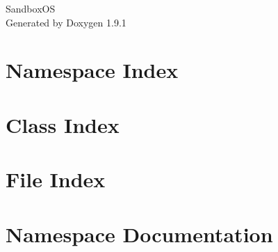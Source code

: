 \let\mypdfximage\pdfximage\def\pdfximage{\immediate\mypdfximage}\documentclass[twoside]{book}
\newcommand{\+}{\discretionary{\mbox{\scriptsize$\hookleftarrow$}}{}{}}
\newcommand{\clearemptydoublepage}{%
  \newpage{\pagestyle{empty}\cleardoublepage}%
}
\begin{document}
\raggedbottom

\hypersetup{pageanchor=false,
             bookmarksnumbered=true,
             pdfencoding=unicode
            }
\begin{titlepage}
\vspace*{7cm}
\begin{center}%
{\Large Sandbox\+OS }\\
\vspace*{1cm}
{\large Generated by Doxygen 1.9.1}\\
\end{center}
\end{titlepage}
\clearemptydoublepage
{}
\tableofcontents
\clearemptydoublepage
{}
\hypersetup{pageanchor=true}

\chapter{Namespace Index}

\chapter{Class Index}

\chapter{File Index}

\chapter{Namespace Documentation}












\end{document}
